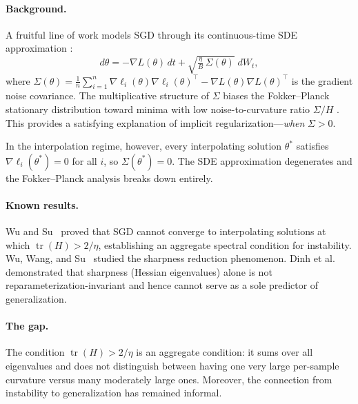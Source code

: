 \documentclass[11pt,a4paper]{article}
\theoremstyle{definition}
\theoremstyle{remark}
\DeclareMathOperator{\tr}{tr}
\begin{document}
\paragraph{Background.}
A fruitful line of work models SGD through its continuous-time SDE approximation
\cite{LiTaiE2017,SmithLe2018}:
\[
  d\theta = -\nabla L(\theta)\,dt + \sqrt{\tfrac{\eta}{B}\,\Sigma(\theta)}\;dW_t,
\]
where $\Sigma(\theta) = \frac{1}{n}\sum_{i=1}^n \nabla\ell_i(\theta)
\nabla\ell_i(\theta)^\top - \nabla L(\theta)\nabla L(\theta)^\top$ is the gradient
noise covariance.  The multiplicative structure of $\Sigma$ biases the
Fokker--Planck stationary distribution toward minima with low noise-to-curvature
ratio $\Sigma/H$ \cite{ChaudhariSoatto2018}.  This provides a satisfying explanation
of implicit regularization---\emph{when} $\Sigma > 0$.

In the interpolation regime, however, every interpolating solution $\theta^*$
satisfies $\nabla\ell_i(\theta^*) = 0$ for all $i$, so $\Sigma(\theta^*) = 0$.
The SDE approximation degenerates and the Fokker--Planck analysis breaks down
entirely.

\paragraph{Known results.}
Wu and Su~\cite{WuSu2023} proved that SGD cannot converge to interpolating solutions
at which $\tr(H) > 2/\eta$, establishing an aggregate spectral condition for
instability.  Wu, Wang, and Su~\cite{WuWangSu2022} studied the sharpness reduction
phenomenon.  Dinh et al.~\cite{Dinh2017} demonstrated that sharpness (Hessian
eigenvalues) alone is not reparameterization-invariant and hence cannot serve as a
sole predictor of generalization.

\paragraph{The gap.}
The condition $\tr(H) > 2/\eta$ is an aggregate condition: it sums over all
eigenvalues and does not distinguish between having one very large per-sample
curvature versus many moderately large ones.  Moreover, the connection from instability
to generalization has remained informal.
\end{document}
